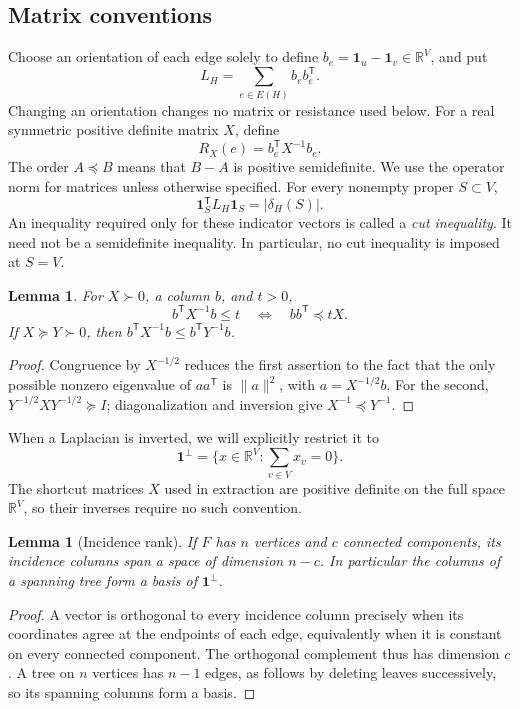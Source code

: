 \documentclass[11pt]{amsart}
\newtheorem{lemma}[theorem]{Lemma}
\theoremstyle{definition}
\theoremstyle{remark}
\numberwithin{equation}{section}
\begin{document}
\subsection{Matrix conventions}

Choose an orientation of each edge solely to define
\(b_e=\mathbf1_u-\mathbf1_v\in\mathbb R^V\), and put
\[
 L_H=\sum_{e\in E(H)}b_eb_e^{\mathsf T}.
\]
Changing an orientation changes no matrix or resistance used below.
For a real symmetric positive definite matrix \(X\), define
\[
 R_X(e)=b_e^{\mathsf T}X^{-1}b_e.
\]
The order \(A\preceq B\) means that \(B-A\) is positive semidefinite.
We use the operator norm for matrices unless otherwise specified.
For every nonempty proper \(S\subset V\),
\[
 \mathbf1_S^{\mathsf T}L_H\mathbf1_S=|\delta_H(S)|.
\]
An inequality required only for these indicator vectors is called a
\emph{cut inequality}. It need not be a semidefinite inequality.
In particular, no cut inequality is imposed at \(S=V\).

\begin{lemma}\label{lem:resistance-order}
For \(X\succ0\), a column \(b\), and \(t>0\),
\[
 b^{\mathsf T}X^{-1}b\le t
 \quad\Longleftrightarrow\quad
 bb^{\mathsf T}\preceq tX.
\]
If \(X\succeq Y\succ0\), then
\(b^{\mathsf T}X^{-1}b\le b^{\mathsf T}Y^{-1}b\).
\end{lemma}
\begin{proof}
Congruence by \(X^{-1/2}\) reduces the first assertion to the fact
that the only possible nonzero eigenvalue of \(aa^{\mathsf T}\) is
\(\|a\|^2\), with \(a=X^{-1/2}b\).
For the second, \(Y^{-1/2}XY^{-1/2}\succeq I\); diagonalization and
inversion give \(X^{-1}\preceq Y^{-1}\).
\end{proof}

When a Laplacian is inverted, we will explicitly restrict it to
\[
 \mathbf1^\perp=\{x\in\mathbb R^V:\textstyle\sum_{v\in V}x_v=0\}.
\]
The shortcut matrices \(X\) used in extraction are positive definite
on the full space \(\mathbb R^V\), so their inverses require no such convention.

\begin{lemma}[Incidence rank]\label{lem:incidence-rank}
If \(F\) has \(n\) vertices and \(c\) connected components, its
incidence columns span a space of dimension \(n-c\).
In particular the columns of a spanning tree form a basis of
\(\mathbf1^\perp\).
\end{lemma}
\begin{proof}
A vector is orthogonal to every incidence column precisely when
its coordinates agree at the endpoints of each edge, equivalently
when it is constant on every connected component.
The orthogonal complement thus has dimension \(c\).
A tree on \(n\) vertices has \(n-1\) edges, as follows by deleting
leaves successively, so its spanning columns form a basis.
\end{proof}
\end{document}
